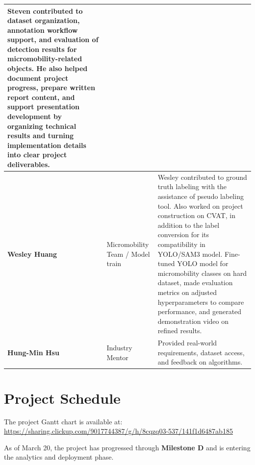 \documentclass[12pt,letterpaper]{article}
\begin{document}
\begin{longtable}{|p{2.5cm}|p{3.5cm}|p{8cm}|}
Steven contributed to dataset organization, annotation workflow support, and evaluation of detection results for micromobility-related objects. He also helped document project progress, prepare written report content, and support presentation development by organizing technical results and turning implementation details into clear project deliverables. \\
\hline
\textbf{Wesley Huang} & Micromobility Team / Model train &
Wesley contributed to ground truth labeling with the assistance of pseudo labeling tool. Also worked on project construction on CVAT, in addition to the label conversion for its compatibility in YOLO/SAM3 model. Fine-tuned YOLO model for micromobility classes on hard dataset, made evaluation metrics on adjusted hyperparameters to compare performance, and generated demonstration video on refined results. \\
\hline
\textbf{Hung-Min Hsu} & Industry Mentor &
Provided real-world requirements, dataset access, and feedback on algorithms. \\
\hline
\end{longtable}

\section{Project Schedule}

The project Gantt chart is available at:\\
\url{https://sharing.clickup.com/9017744387/g/h/8cqzq03-537/141f1d6487ab185}

As of March 20, the project has progressed through \textbf{Milestone D} and is entering the analytics and deployment phase.
\end{document}
